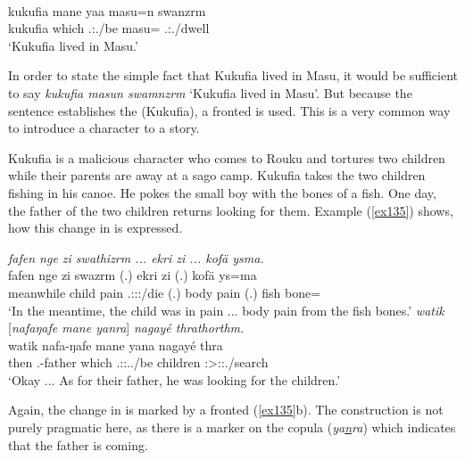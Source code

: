 \begin{exe}
	\\
	\gll kukufia mane yaa masu=n swanzrm\\
	kukufia which \Tsg.\Masc:\Pst.\Ipfv/be masu=\Loc{} \Tsg.\Masc:\Pst.\Dur/dwell\\
	\trans `Kukufia lived in Masu.'
	\label{ex134}
\end{exe}

In order to state the simple fact that Kukufia lived in Masu, it would be sufficient to say \emph{kukufia masun swamnzrm} `Kukufia lived in Masu'. But because the sentence establishes the  (Kukufia), a fronted  is used. This is a very common way to introduce a character to a story.%

Kukufia is a malicious character who comes to Rouku and tortures two children while their parents are away at a sago camp. Kukufia takes the two children fishing in his canoe. He pokes the small boy with the bones of a fish. One day, the father of the two children returns looking for them. Example (\ref{ex135}) shows, how this change in  is expressed.

\begin{exe}
	\ex \label{ex135}
	\begin{xlist}
	\ex
	\emph{fafen nge zi swathizrm ... ekri zi ... kofä ysma.}\\
	\gll fafen nge zi swazrm (.) ekri zi (.) kofä ys=ma\\
	meanwhile child pain \Tsg.\Masc:\Sbj:\Pst:\Dur/die (.) body pain (.) fish bone=\Char\\
	\trans `In the meantime, the child was in pain ... body pain from the fish bones.'
	\ex \emph{watik} [\emph{nafaŋafe mane yanra}] \emph{nagayé thrathorthm.}\\
	\gll watik nafa-ŋafe mane yana nagayé thra\\
	then \Third.\Poss-father which \Tsg.\Masc:\Sbj:\Pst.\Ipfv.\Venit/be children \Stsg:\Sbj>\Stpl:\Obj:\Irr.\Pfv/search\\
	\trans `Okay ... As for their father, he was looking for the children.'\\
	\end{xlist}
\end{exe}

Again, the change in  is marked by a fronted  (\ref{ex135}b). The construction is not purely pragmatic here, as there is a  marker on the copula (\emph{ya\underline{n}ra}) which indicates that the father is coming.%

